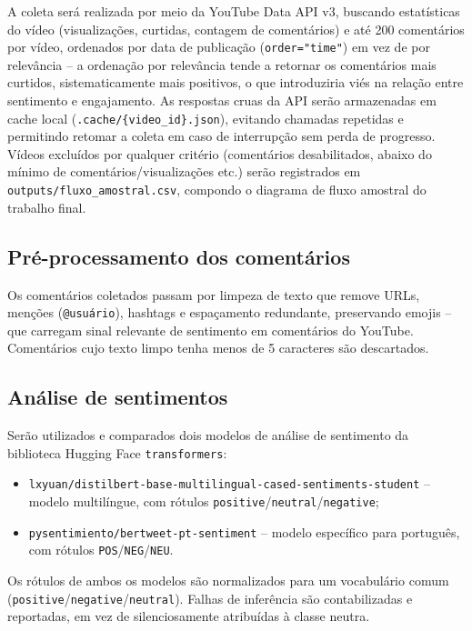\documentclass[12pt,a4paper]{article}
\begin{document}
A coleta será realizada por meio da YouTube Data API v3, buscando estatísticas do vídeo (visualizações, curtidas, contagem de comentários) e até 200 comentários por vídeo, ordenados por data de publicação (\texttt{order="time"}) em vez de por relevância -- a ordenação por relevância tende a retornar os comentários mais curtidos, sistematicamente mais positivos, o que introduziria viés na relação entre sentimento e engajamento. As respostas cruas da API serão armazenadas em cache local (\texttt{.cache/\{video\_id\}.json}), evitando chamadas repetidas e permitindo retomar a coleta em caso de interrupção sem perda de progresso. Vídeos excluídos por qualquer critério (comentários desabilitados, abaixo do mínimo de comentários/visualizações etc.) serão registrados em \texttt{outputs/fluxo\_amostral.csv}, compondo o diagrama de fluxo amostral do trabalho final.

\subsection{Pré-processamento dos comentários}

Os comentários coletados passam por limpeza de texto que remove URLs, menções (\texttt{@usuário}), hashtags e espaçamento redundante, preservando emojis -- que carregam sinal relevante de sentimento em comentários do YouTube. Comentários cujo texto limpo tenha menos de 5 caracteres são descartados.

\subsection{Análise de sentimentos}
\label{sec:sentimento}

Serão utilizados e comparados dois modelos de análise de sentimento da biblioteca Hugging Face \texttt{transformers}:

\begin{itemize}
    \item \texttt{lxyuan/distilbert-base-multilingual-cased-sentiments-student} -- modelo multilíngue, com rótulos \texttt{positive}/\texttt{neutral}/\texttt{negative};
    \item \texttt{pysentimiento/bertweet-pt-sentiment} -- modelo específico para português, com rótulos \texttt{POS}/\texttt{NEG}/\texttt{NEU}.
\end{itemize}

Os rótulos de ambos os modelos são normalizados para um vocabulário comum (\texttt{positive}/\texttt{negative}/\texttt{neutral}). Falhas de inferência são contabilizadas e reportadas, em vez de silenciosamente atribuídas à classe neutra.
\end{document}
